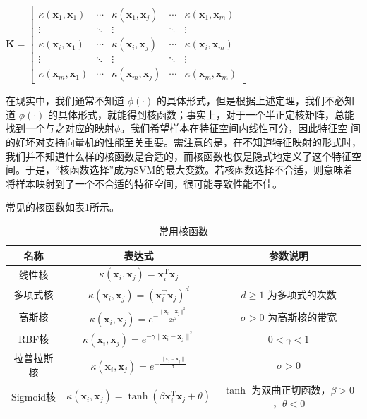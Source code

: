 \documentclass{ctexart}
\begin{document}
	\begin{center}
		$\mathbf{K}=\left[\begin{array}{ccccc}
			\kappa\left(\boldsymbol{x}_{1}, \boldsymbol{x}_{1}\right) & \cdots & \kappa\left(\boldsymbol{x}_{1}, \boldsymbol{x}_{j}\right) & \cdots & \kappa\left(\boldsymbol{x}_{1}, \boldsymbol{x}_{m}\right) \\
			\vdots & \ddots & \vdots & \ddots & \vdots \\
			\kappa\left(\boldsymbol{x}_{i}, \boldsymbol{x}_{1}\right) & \cdots & \kappa\left(\boldsymbol{x}_{i}, \boldsymbol{x}_{j}\right) & \cdots & \kappa\left(\boldsymbol{x}_{i}, \boldsymbol{x}_{m}\right) \\
			\vdots & \ddots & \vdots & \ddots & \vdots \\
			\kappa\left(\boldsymbol{x}_{m}, \boldsymbol{x}_{1}\right) & \cdots & \kappa\left(\boldsymbol{x}_{m}, \boldsymbol{x}_{j}\right) & \cdots & \kappa\left(\boldsymbol{x}_{m}, \boldsymbol{x}_{m}\right)
		\end{array}\right]$
	\end{center}
	

	在现实中，我们通常不知道 $\phi(\cdot)$ 的具体形式，但是根据上述定理，我们不必知道 $\phi(\cdot)$ 的具体形式，就能得到核函数；事实上，对于一个半正定核矩阵，总能找到一个与之对应的映射$\phi$。我们希望样本在特征空间内线性可分，因此特征空
	间的好坏对支持向量机的性能至关重要。需注意的是，在不知道特征映射的形式时，我们并不知道什么样的核函数是合适的，而核函数也仅是隐式地定义了这个特征空间。于是，“核函数选择”成为SVM的最大变数。若核函数选择不合适，则意味着将样本映射到了一个不合适的特征空间，很可能导致性能不佳。
	
	常见的核函数如表\ref{核函数表}所示。
	
	\begin{table}[!htb]
		\centering
		\begin{tabular}{c|c|c}
			\hline\hline
			名称&表达式&参数说明\\
			\hline\hline
			线性核 & $\kappa(\boldsymbol{x}_i,\boldsymbol{x}_j)=\boldsymbol{x}_i^\mathrm{T}\boldsymbol{x}_j$&\\
			\hline
			多项式核&$\kappa(\boldsymbol{x}_i,\boldsymbol{x}_j)=\left(\boldsymbol{x}_i^\mathrm{T}\boldsymbol{x}_j\right)^d$&$d\geqslant1$ 为多项式的次数\\
			\hline
			高斯核&$\kappa(\boldsymbol{x}_i,\boldsymbol{x}_j)=e^{-\frac{\|\boldsymbol{x}_i-\boldsymbol{x}_j\|^2}{2\sigma^2}}$&$\sigma>0$ 为高斯核的带宽\\
			\hline
			RBF核&$\kappa(\boldsymbol{x}_i,\boldsymbol{x}_j)=e^{-\gamma\|\boldsymbol{x}_i-\boldsymbol{x}_j\|^2}$&$0<\gamma<1$\\
			\hline
			拉普拉斯核&$\kappa(\boldsymbol{x}_i,\boldsymbol{x}_j)=e^{-\frac{\|\boldsymbol{x}_i-\boldsymbol{x}_j\|}{\sigma}}$ &$\sigma>0$\\
			\hline
			Sigmoid核&$\kappa(\boldsymbol{x}_i,\boldsymbol{x}_j)=\tanh\left(\beta\boldsymbol{x}_i^\mathrm{T}\boldsymbol{x}_j+\theta\right)$&$\tanh$ 为双曲正切函数，$\beta>0$，$\theta<0$\\
			\hline\hline
		\end{tabular}
		\caption{常用核函数}
		\label{核函数表}
	\end{table}
	
\end{document}
